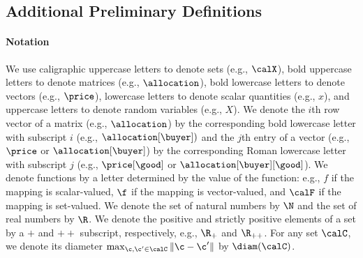 \subsection{Additional Preliminary Definitions}\label{sec_app:prelims}

\paragraph{Notation}
We use caligraphic uppercase letters to denote sets (e.g., $\calX$), bold uppercase letters to denote matrices (e.g., $\allocation$), bold lowercase letters to denote vectors (e.g., $\price$), lowercase letters to denote scalar quantities (e.g., $x$), and uppercase letters to denote random variables (e.g., $X$).
We denote the $i$th row vector of a matrix (e.g., $\allocation$) by the corresponding bold lowercase letter with subscript $i$ (e.g., $\allocation[\buyer])$ and the $j$th entry of a vector (e.g., $\price$ or $\allocation[\buyer]$) by the corresponding Roman lowercase letter with subscript $j$ (e.g., $\price[\good]$ or $\allocation[\buyer][\good]$).
We denote functions by a letter determined by the value of the function: e.g., $f$ if the mapping is scalar-valued, $\f$ if the mapping is vector-valued, and $\calF$ if the mapping is set-valued. We denote the set of natural numbers by $\N$ and the set of real numbers by $\R$.
We denote the positive and strictly positive elements of a set by a $+$ and $++$ subscript, respectively, e.g., $\R_+$ and $\R_{++}$.
For any set $\calC$, we denote its diameter $\max_{\c, \c^\prime \in \calC} \|\c - \c^\prime \|$ by $\diam(\calC)$.